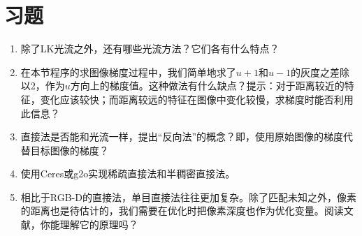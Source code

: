 \section*{习题}
\begin{enumerate}
	\item 除了LK光流之外，还有哪些光流方法？它们各有什么特点？
	\item 在本节程序的求图像梯度过程中，我们简单地求了$u+1$和$u-1$的灰度之差除以2，作为$u$方向上的梯度值。这种做法有什么缺点？提示：对于距离较近的特征，变化应该较快；而距离较远的特征在图像中变化较慢，求梯度时能否利用此信息？
	\item 直接法是否能和光流一样，提出“反向法”的概念？即，使用原始图像的梯度代替目标图像的梯度？
	\item[\optional] 使用Ceres或g2o实现稀疏直接法和半稠密直接法。
	\item 相比于RGB-D的直接法，单目直接法往往更加复杂。除了匹配未知之外，像素的距离也是待估计的，我们需要在优化时把像素深度也作为优化变量。阅读文献\cite{Engel2013, Engel2014}，你能理解它的原理吗？
\end{enumerate}


